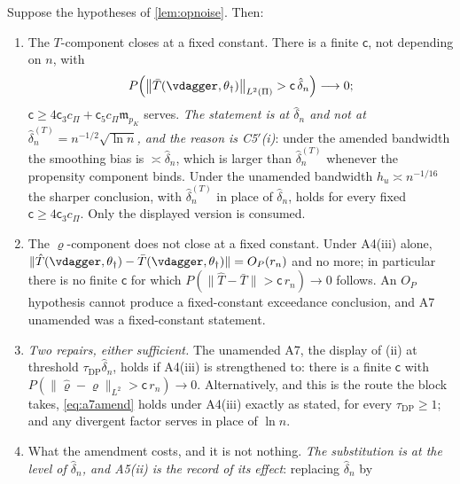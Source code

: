 \begin{proposition}\label{prp:stopfeas}
Suppose the hypotheses of \cref{lem:opnoise}. Then:
\begin{enumerate}
\item[(i)] The $T$-component closes at a fixed constant. There is a finite $\mathsf c$, not
depending on $n$, with
\[
P\Big(\big\|\bar T(\vdagger,\theta_\dagger)\big\|_{L^{2}(\Pi)}>\mathsf c\,\hat\delta_n\Big)\longrightarrow0 ;
\]
$\mathsf c\ge4\mathsf c_3c_\Pi+\mathsf c_5c_\Pi\mathfrak m_{p_K}$ serves. \emph{The statement is at
$\hat\delta_n$ and not at $\hat\delta_n^{(T)}=n^{-1/2}\sqrt{\ln n}$, and the reason is C5$'$(i)}: under
the amended bandwidth the smoothing bias is $\asymp\hat\delta_n$, which is larger than
$\hat\delta_n^{(T)}$ whenever the propensity component binds. Under the unamended bandwidth
$h_u\asymp n^{-1/16}$ the sharper conclusion, with $\hat\delta_n^{(T)}$ in place of $\hat\delta_n$,
holds for every fixed $\mathsf c\ge4\mathsf c_3c_\Pi$. Only the displayed version is consumed.
\item[(ii)] The $\varrho$-component does not close at a fixed constant. Under A4(iii) alone,
$\|\hat T(\vdagger,\theta_\dagger)-\bar T(\vdagger,\theta_\dagger)\|=O_P(r_n)$ and no more; in
particular there is no finite $\mathsf c$ for which
$P(\|\hat T-\bar T\|>\mathsf c\,r_n)\to0$ follows. An $O_P$ hypothesis cannot produce a
fixed-constant exceedance conclusion, and A7 unamended was a fixed-constant statement.
\item[(iii)] \emph{Two repairs, either sufficient.} The unamended A7, the display of (ii) at
threshold $\tau_{\mathrm{DP}}\hat\delta_n$, holds if A4(iii) is strengthened to: there is a finite
$\mathsf c$ with $P(\|\hat\varrho-\varrho\|_{L^{2}}>\mathsf c\,r_n)\to0$. Alternatively, and this is
the route the block takes, \eqref{eq:a7amend} holds under A4(iii) exactly as stated, for every
$\tau_{\mathrm{DP}}\ge1$; and any divergent factor serves in place of $\ln n$.
\item[(iv)] What the amendment costs, and it is not nothing. \emph{The substitution is at the level
of $\hat\delta_n$, and A5(ii) is the record of its effect}: replacing $\hat\delta_n$ by

\end{enumerate}
\end{proposition}
